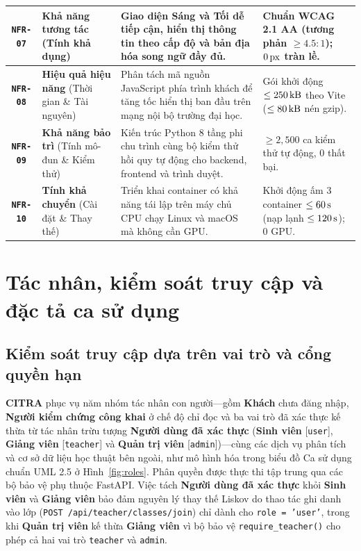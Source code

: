 {\begin{longtable}{|C{0.11}|L{0.25}|L{0.40}|L{0.24}|}
\hline
\textbf{\texttt{NFR-07}} & \textbf{Khả năng tương tác} (Tính khả dụng) & Giao diện Sáng và Tối dễ tiếp cận, hiển thị thông tin theo cấp độ và bản địa hóa song ngữ đầy đủ. & Chuẩn \textbf{WCAG 2.1 AA} (tương phản $\ge 4.5:1$); $0\text{\,px}$ tràn lề. \\
\hline
\textbf{\texttt{NFR-08}} & \textbf{Hiệu quả hiệu năng} (Thời gian \& Tài nguyên) & Phân tách mã nguồn JavaScript phía trình khách để tăng tốc hiển thị ban đầu trên mạng nội bộ trường đại học. & Gói khởi động \textbf{$\le 250\text{\,kB}$} theo Vite ($\le 80\text{\,kB}$ nén gzip). \\
\hline
\textbf{\texttt{NFR-09}} & \textbf{Khả năng bảo trì} (Tính mô-đun \& Kiểm thử) & Kiến trúc Python 8 tầng phi chu trình cùng bộ kiểm thử hồi quy tự động cho backend, frontend và trình duyệt. & \textbf{$\ge 2{,}500$} ca kiểm thử tự động, $0$ thất bại. \\
\hline
\textbf{\texttt{NFR-10}} & \textbf{Tính khả chuyển} (Cài đặt \& Thay thế) & Triển khai container có khả năng tái lập trên máy chủ CPU chạy Linux và macOS mà không cần GPU. & Khởi động ấm 3 container \textbf{$\le 60\text{\,s}$} (nạp lạnh \textbf{$\le 120\text{\,s}$}); $0$ GPU. \\
\hline
\end{longtable}
}

\section{Tác nhân, kiểm soát truy cập và đặc tả ca sử dụng}

\subsection{Kiểm soát truy cập dựa trên vai trò và cổng quyền hạn}

\textbf{CITRA} phục vụ năm nhóm tác nhân con người---gồm \textbf{Khách} chưa đăng nhập, \textbf{Người kiểm chứng công khai} ở chế độ chỉ đọc và ba vai trò đã xác thực kế thừa từ tác nhân trừu tượng \textbf{Người dùng đã xác thực} (\textbf{Sinh viên} [\texttt{user}], \textbf{Giảng viên} [\texttt{teacher}] và \textbf{Quản trị viên} [\texttt{admin}])---cùng các dịch vụ phân tích và cơ sở dữ liệu học thuật bên ngoài, như mô hình hóa trong biểu đồ Ca sử dụng chuẩn UML 2.5 ở Hình~\ref{fig:roles}. Phân quyền được thực thi tập trung qua các bộ bảo vệ phụ thuộc FastAPI. Việc tách \textbf{Người dùng đã xác thực} khỏi \textbf{Sinh viên} và \textbf{Giảng viên} bảo đảm nguyên lý thay thế Liskov do thao tác ghi danh vào lớp (\texttt{POST /api/teacher/classes/join}) chỉ dành cho \texttt{role = 'user'}, trong khi \textbf{Quản trị viên} kế thừa \textbf{Giảng viên} vì bộ bảo vệ \texttt{require\_teacher()} cho phép cả hai vai trò \texttt{teacher} và \texttt{admin}.

